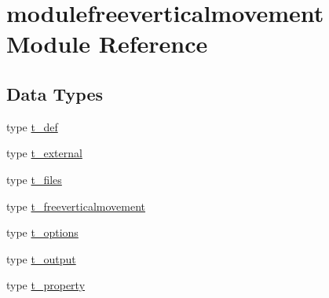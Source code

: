 \hypertarget{namespacemodulefreeverticalmovement}{}\section{modulefreeverticalmovement Module Reference}
\label{namespacemodulefreeverticalmovement}
\subsection*{Data Types}
\begin{DoxyCompactItemize}
\item 
type \mbox{\hyperlink{structmodulefreeverticalmovement_1_1t__def}{t\+\_\+def}}
\item 
type \mbox{\hyperlink{structmodulefreeverticalmovement_1_1t__external}{t\+\_\+external}}
\item 
type \mbox{\hyperlink{structmodulefreeverticalmovement_1_1t__files}{t\+\_\+files}}
\item 
type \mbox{\hyperlink{structmodulefreeverticalmovement_1_1t__freeverticalmovement}{t\+\_\+freeverticalmovement}}
\item 
type \mbox{\hyperlink{structmodulefreeverticalmovement_1_1t__options}{t\+\_\+options}}
\item 
type \mbox{\hyperlink{structmodulefreeverticalmovement_1_1t__output}{t\+\_\+output}}
\item 
type \mbox{\hyperlink{structmodulefreeverticalmovement_1_1t__property}{t\+\_\+property}}
\end{DoxyCompactItemize}
